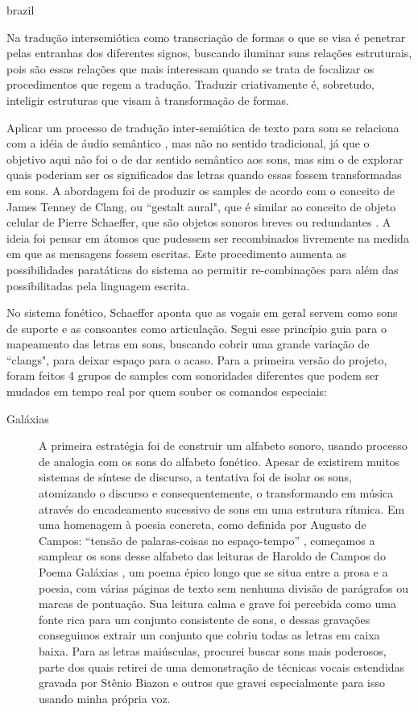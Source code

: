 \begin{otherlanguage*}{brazil}
\begin{citacao}
Na tradução intersemiótica como transcriação de formas o que se visa é penetrar pelas entranhas dos diferentes signos, buscando iluminar suas relações estruturais, pois são essas relações que mais interessam quando se trata de focalizar os procedimentos que regem a tradução. Traduzir criativamente é, sobretudo, inteligir estruturas que visam à transformação de formas. \cite[71]{JulioPlaza1969}
\end{citacao}

Aplicar um processo de tradução inter-semiótica de texto para som se relaciona com a idéia de áudio semântico \cite{Kostek:2010}, mas não no sentido tradicional, já que o objetivo aqui não foi o de dar sentido semântico aos sons, mas sim o de explorar quais poderiam ser os significados das letras quando essas fossem transformadas em sons. A abordagem foi de produzir os samples de acordo com o conceito de James Tenney \cite{Tenney1988} de Clang, ou ``gestalt aural", que é similar ao conceito de objeto celular de Pierre Schaeffer, que são objetos sonoros breves ou redundantes \cite{Chion1983}. A ideia foi pensar em átomos que pudessem ser recombinados livremente na medida em que as mensagens fossem escritas. Este procedimento aumenta as possibilidades paratáticas do sistema ao permitir re-combinações para além das possibilitadas pela linguagem escrita.


No sistema fonético, Schaeffer \cite{Schaeffer2007} aponta que as vogais em geral servem como sons de suporte e as consoantes como articulação. Segui esse princípio guia para o mapeamento das letras em sons, buscando cobrir uma grande variação de ``clangs", para deixar espaço para o acaso. Para a primeira versão do projeto, foram feitos 4 grupos de samples com sonoridades diferentes que podem ser mudados em tempo real por quem souber os comandos especiais: 

\begin{description}
 \item[Galáxias] A primeira estratégia foi de construir um alfabeto sonoro, usando processo de analogia com os sons do alfabeto fonético. Apesar de existirem muitos sistemas de síntese de discurso, a tentativa foi de isolar os sons, atomizando o discurso e consequentemente, o transformando em música através do encadeamento sucessivo de sons em uma estrutura rítmica. 
Em uma homenagem à poesia concreta, como definida por Augusto de Campos: ``tensão de palaras-coisas no espaço-tempo'' \cite[45]{campos_teoria_2014}, começamos a samplear os sons desse alfabeto das leituras de Haroldo de Campos do Poema Galáxias \cite{Campos2004}, um poema épico longo que se situa entre a prosa e a poesia, com várias páginas de texto sem nenhuma divisão de parágrafos ou marcas de pontuação. Sua leitura calma e grave foi percebida como uma fonte rica para um conjunto consistente de sons, e dessas gravações conseguimos extrair um conjunto que cobriu todas as letras em caixa baixa. Para as letras maiúsculas, procurei buscar sons mais poderosos, parte dos quais retirei de uma demonstração de técnicas vocais estendidas gravada por Stênio Biazon e outros que gravei especialmente para isso usando minha própria voz.  


\end{description}
\end{otherlanguage*}
